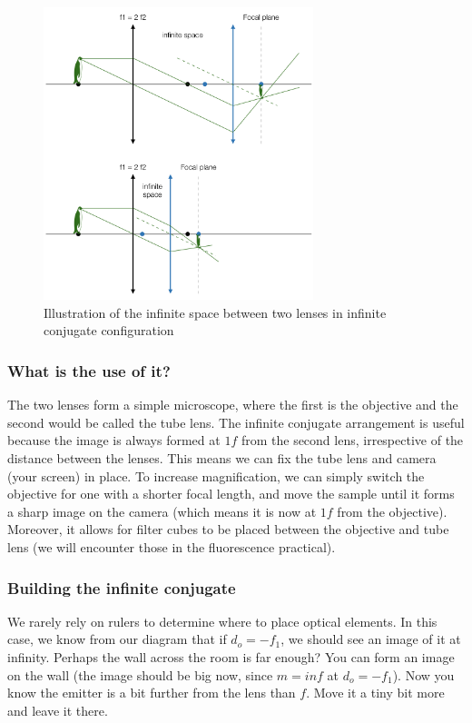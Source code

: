 \documentclass[a4paper]{report}
\begin{document}
	\begin{figure}[h]
		\center
		\includegraphics[width=0.7\textwidth]{figures/hint_infinite_conjugate.png}
		\caption{Illustration of the infinite space between two lenses in infinite conjugate configuration}
		\label{hint_infinite}
	\end{figure}

    
	\subsubsection{What is the use of it?}
	The two lenses form a simple microscope, where the first is the objective and the second would be called the tube lens. The infinite conjugate arrangement is useful because the image is always formed at $1f$ from the second lens, irrespective of the distance between the lenses. This means we can fix the tube lens and camera (your screen) in place. To increase magnification, we can simply switch the objective for one with a shorter focal length, and move the sample until it forms a sharp image on the camera (which means it is now at $1f$ from the objective). Moreover, it allows for filter cubes to be placed between the objective and tube lens (we will encounter those in the fluorescence practical). 

    
    \subsubsection{Building the infinite conjugate}
	We rarely rely on rulers to determine where to place optical elements. In this case, we know from our diagram that if $d_o=-f_1$, we should see an image of it at infinity. Perhaps the wall across the room is far enough? You can form an image on the wall (the image should be big now, since $m=inf$ at $d_o=-f_1$). Now you know the emitter is a bit further from the lens than $f$. Move it a tiny bit more and leave it there. 
\end{document}
